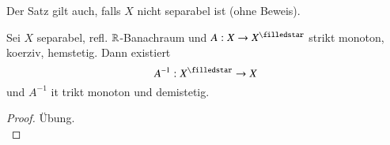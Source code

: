 \begin{remark}
    Der Satz gilt auch, falls $X$ nicht separabel ist (ohne Beweis).
\end{remark}

\begin{cor}\label{4.7}
    Sei $X$ separabel, refl. $\mathbb{R}$-Banachraum und $A:X\ra X^\star$ strikt monoton, koerziv, hemstetig.
    Dann existiert
    \[
        A^{-1}:X^\star\ra X
    \]
    und $A^{-1}$ it trikt monoton und demistetig.
\end{cor}

\begin{proof}
    Übung. \[ \]
\end{proof}
